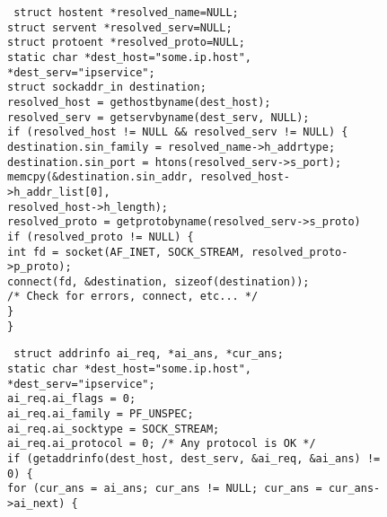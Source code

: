 \begin{figure}
\begin{framed}
{\tt\small
struct hostent  *resolved\_name=NULL;\\
struct servent  *resolved\_serv=NULL;\\
struct protoent *resolved\_proto=NULL;\\
static char     *dest\_host="some.ip.host", *dest\_serv="ipservice";\\
struct sockaddr\_in destination;\\ 
resolved\_host = gethostbyname(dest\_host);\\
resolved\_serv = getservbyname(dest\_serv, NULL);\\
if (resolved\_host != NULL \&\& resolved\_serv != NULL) \{\\
\qquad destination.sin\_family = resolved\_name->h\_addrtype;\\
\qquad destination.sin\_port = htons(resolved\_serv->s\_port);\\
\qquad memcpy(\&destination.sin\_addr, resolved\_host->h\_addr\_list[0],\\
\qquad\qquad resolved\_host->h\_length);\\
\qquad resolved\_proto = getprotobyname(resolved\_serv->s\_proto)\\
\qquad if (resolved\_proto != NULL) \{\\
\qquad\qquad int fd = socket(AF\_INET, SOCK\_STREAM, resolved\_proto->p\_proto);\\
\qquad\qquad connect(fd, \&destination, sizeof(destination));\\
\qquad\qquad /* Check for errors, connect, etc... */\\
\qquad \}\\
\}
}
\end{framed}
\par
\begin{framed}
{\tt\small
struct addrinfo ai\_req, *ai\_ans, *cur\_ans;\\
static char     *dest\_host="some.ip.host", *dest\_serv="ipservice";\\
ai\_req.ai\_flags = 0;\\
ai\_req.ai\_family = PF\_UNSPEC;\\
ai\_req.ai\_socktype = SOCK\_STREAM;\\
ai\_req.ai\_protocol = 0; /* Any protocol is OK */\\
if (getaddrinfo(dest\_host, dest\_serv, \&ai\_req, \&ai\_ans) != 0) \{\\
\qquad for (cur\_ans = ai\_ans; cur\_ans != NULL; cur\_ans = cur\_ans->ai\_next) \{\\
}
\end{framed}
\end{figure}
